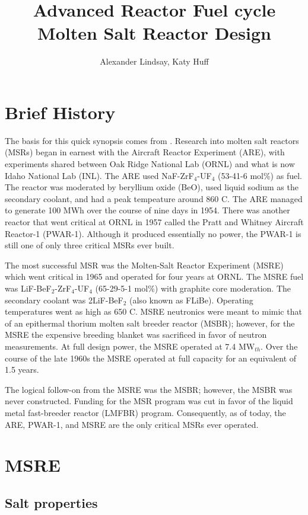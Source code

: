 \documentclass{article}
\title{Advanced Reactor Fuel cycle Molten Salt Reactor Design}
\author{Alexander Lindsay, Katy Huff} %
\begin{document}
\maketitle

\section{Brief History}

The basis for this quick synopsis comes from
\cite{wiki:Molten_salt_reactor}. Research into molten salt reactors (MSRs) began
in earnest with the Aircraft Reactor Experiment (ARE), with experiments shared
between Oak Ridge National Lab (ORNL) and what is now Idaho National Lab
(INL). The ARE used NaF-ZrF$_4$-UF$_4$ (53-41-6 mol\%) as fuel. The reactor was
moderated by beryllium oxide (BeO), used liquid sodium as the secondary coolant,
and had a peak tempeature around 860 \textdegree C. The ARE managed to generate
100 MWh over the course of nine days in 1954. There was another reactor that
went critical at ORNL in 1957 called the Pratt and Whitney Aircraft Reactor-1
(PWAR-1). Although it produced essentially no power, the PWAR-1 is still one of
only three critical MSRs ever built.

The most successful MSR was the Molten-Salt Reactor Experiment (MSRE) which went
critical in 1965 and operated for four years at ORNL. The MSRE fuel was
LiF-BeF$_2$-ZrF$_4$-UF$_4$ (65-29-5-1 mol\%) with graphite core moderation. The
secondary coolant was 2LiF-BeF$_2$ (also known as FLiBe). Operating temperatures
went as high as 650 \textdegree C. MSRE neutronics were meant to mimic that of
an epithermal thorium molten salt breeder reactor (MSBR); however, for the MSRE
the expensive breeding blanket was sacrificed in favor of neutron
measurements. At full design power, the MSRE operated at 7.4 MW$_{th}$. Over the
course of the late 1960s the MSRE operated at full capacity for an equivalent of
1.5 years.

The logical follow-on from the MSRE was the MSBR; however, the MSBR was never
constructed. Funding for the MSR program was cut in favor of the liquid metal
fast-breeder reactor (LMFBR) program. Consequently, as of today, the ARE,
PWAR-1, and MSRE are the only critical MSRs ever operated.

\section{MSRE}

\subsection{Salt properties}
\end{document}

